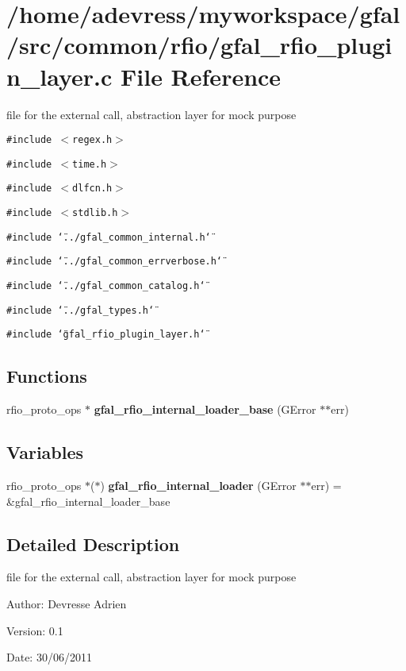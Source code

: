 \section{/home/adevress/myworkspace/gfal/src/common/rfio/gfal\_\-rfio\_\-plugin\_\-layer.c File Reference}
\label{gfal__rfio__plugin__layer_8c}
file for the external call, abstraction layer for mock purpose 

{\tt \#include $<$regex.h$>$}\par
{\tt \#include $<$time.h$>$}\par
{\tt \#include $<$dlfcn.h$>$}\par
{\tt \#include $<$stdlib.h$>$}\par
{\tt \#include \char`\"{}../gfal\_\-common\_\-internal.h\char`\"{}}\par
{\tt \#include \char`\"{}../gfal\_\-common\_\-errverbose.h\char`\"{}}\par
{\tt \#include \char`\"{}../gfal\_\-common\_\-catalog.h\char`\"{}}\par
{\tt \#include \char`\"{}../gfal\_\-types.h\char`\"{}}\par
{\tt \#include \char`\"{}gfal\_\-rfio\_\-plugin\_\-layer.h\char`\"{}}\par
\subsection*{Functions}
\begin{CompactItemize}
\item 
rfio\_\-proto\_\-ops $\ast$ \textbf{gfal\_\-rfio\_\-internal\_\-loader\_\-base} (GError $\ast$$\ast$err)\label{gfal__rfio__plugin__layer_8c_6c40bba38f2b638d298d27a8d8cdb5bf}

\end{CompactItemize}
\subsection*{Variables}
\begin{CompactItemize}
\item 
rfio\_\-proto\_\-ops $\ast$($\ast$) \textbf{gfal\_\-rfio\_\-internal\_\-loader} (GError $\ast$$\ast$err) = \&gfal\_\-rfio\_\-internal\_\-loader\_\-base\label{gfal__rfio__plugin__layer_8c_6c17e62821e2194325693771c626b7bb}

\end{CompactItemize}


\subsection{Detailed Description}
file for the external call, abstraction layer for mock purpose 

\begin{Desc}
\item[Author:]Devresse Adrien \end{Desc}
\begin{Desc}
\item[Version:]0.1 \end{Desc}
\begin{Desc}
\item[Date:]30/06/2011 \end{Desc}
